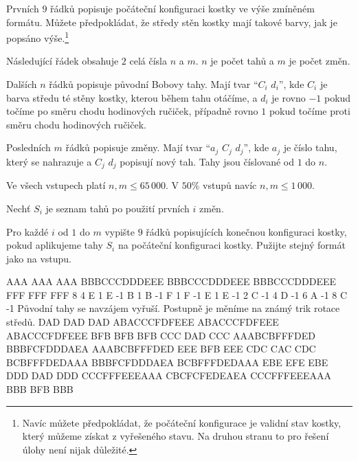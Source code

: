 Prvních $9$ řádků popisuje počáteční konfiguraci kostky
ve výše zmíněném formátu. Můžete předpokládat, že středy
stěn kostky mají takové barvy, jak je popsáno
výše.\footnote{Navíc můžete předpokládat, že počáteční konfigurace
je validní stav kostky, který můžeme získat z vyřešeného stavu.
Na druhou stranu to pro řešení úlohy není nijak důležité.}

Následující řádek obsahuje $2$ celá čísla $n$ a $m$.
$n$ je počet tahů a $m$ je počet změn.

Dalších $n$ řádků popisuje původní Bobovy tahy.
Mají tvar ``$C_i$ $d_i$'',
kde $C_i$ je barva středu té stěny kostky,
kterou během tahu otáčíme, a $d_i$ je rovno $-1$
pokud točíme po směru chodu hodinových ručiček, případně
rovno $1$ pokud točíme proti směru chodu hodinových ručiček.

Posledních $m$ řádků popisuje změny.
Mají tvar ``$a_j$ $C_j$ $d_j$'',
kde $a_j$ je číslo tahu, který se nahrazuje
a $C_j$ $d_j$ popisují nový tah.
Tahy jsou číslované od $1$ do $n$.


Ve všech vstupech platí $n, m \leq 65\,000$.
V $50\%$ vstupů navíc $n, m \leq 1\,000$.

\pagebreak


Nechť $S_i$ je seznam tahů po použití prvních $i$ změn.

Pro každé $i$ od $1$ do $m$ vypište $9$ řádků popisujících konečnou konfiguraci kostky, pokud aplikujeme tahy $S_i$ na počáteční konfiguraci kostky. Pužijte stejný formát jako na vstupu.


\sampleIN
AAA
AAA
AAA
BBBCCCDDDEEE
BBBCCCDDDEEE
BBBCCCDDDEEE
FFF
FFF
FFF
8 4
E 1
E -1
B 1
B -1
F 1
F -1
E 1
E -1
2 C -1
4 D -1
6 A -1
8 C -1
\sampleCOMMENT
Původní tahy se navzájem vyřuší.
Postupně je měníme na známý trik
rotace středů.
\sampleOUT
DAD
DAD
DAD
ABACCCFDFEEE
ABACCCFDFEEE
ABACCCFDFEEE
BFB
BFB
BFB
CCC
DAD
CCC
AAABCBFFFDED
BBBFCFDDDAEA
AAABCBFFFDED
EEE
BFB
EEE
CDC
CAC
CDC
BCBFFFDEDAAA
BBBFCFDDDAEA
BCBFFFDEDAAA
EBE
EFE
EBE
DDD
DAD
DDD
CCCFFFEEEAAA
CBCFCFEDEAEA
CCCFFFEEEAAA
BBB
BFB
BBB
\sampleEND



